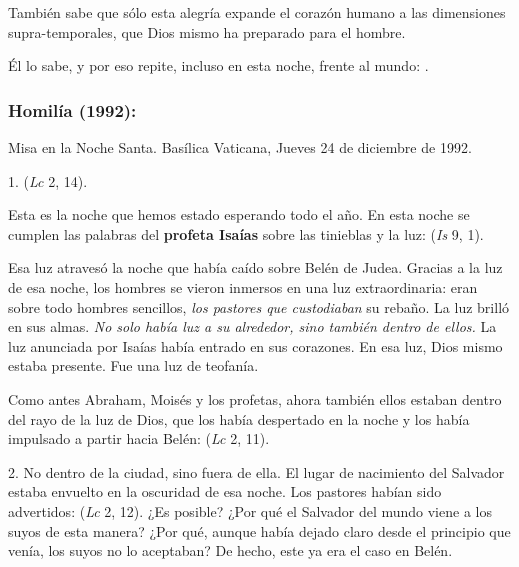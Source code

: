\begin{body}
\begin{body}
		También sabe que sólo esta alegría expande el corazón humano a las dimensiones supra-temporales, que Dios mismo ha preparado para el hombre.
		
		Él lo sabe, y por eso repite, incluso en esta noche, frente al mundo: .
	\end{body}
	
	\subsubsection{Homilía (1992): }
	
	Misa en la Noche Santa. Basílica Vaticana, Jueves 24 de diciembre de 1992.
	
	\begin{body}
		1.  (\emph{Lc} 2, 14).
		
		Esta es la noche que hemos estado esperando todo el año. En esta noche se cumplen las palabras del \textbf{profeta Isaías} sobre las tinieblas y la luz:  (\emph{Is} 9, 1).
		
		Esa luz atravesó la noche que había caído sobre Belén de Judea. Gracias a la luz de esa noche, los hombres se vieron inmersos en una luz extraordinaria: eran sobre todo hombres sencillos, \emph{los pastores que custodiaban} su rebaño. La luz brilló en sus almas. \emph{No solo había luz a su alrededor, sino también dentro de ellos.} La luz anunciada por Isaías había entrado en sus corazones. En esa luz, Dios mismo estaba presente. Fue una luz de teofanía.
		
		Como antes Abraham, Moisés y los profetas, ahora también ellos estaban dentro del rayo de la luz de Dios, que los había despertado en la noche y los había impulsado a partir hacia Belén:  (\emph{Lc} 2, 11).
		
		2. No dentro de la ciudad, sino fuera de ella. El lugar de nacimiento del Salvador estaba envuelto en la oscuridad de esa noche. Los pastores habían sido advertidos:  (\emph{Lc} 2, 12). ¿Es posible? ¿Por qué el Salvador del mundo viene a los suyos de esta manera? ¿Por qué, aunque había dejado claro desde el principio que venía, los suyos no lo aceptaban? De hecho, este ya era el caso en Belén.
		

\end{body}
\end{body}
